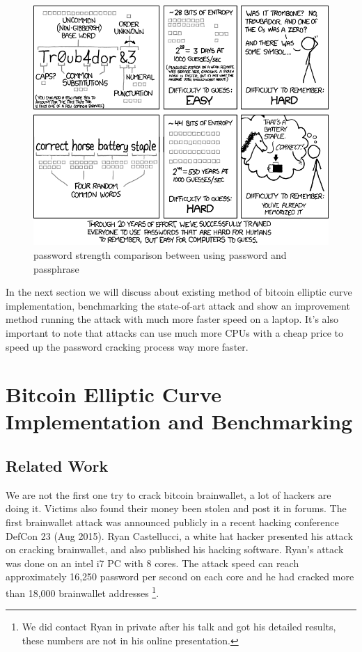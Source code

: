  \begin{figure}[h!]
 	\centering
 	\includegraphics[width=140mm]{./pics/password_strength.png}
 	\caption{password strength comparison between using password and passphrase}
 	\label{fig:password_strength}
 \end{figure}
 
In the next section we will discuss about existing method of bitcoin elliptic curve implementation, benchmarking the state-of-art attack and show an improvement method running the attack with much more faster speed on a laptop. It's also important to note that attacks can use much more CPUs with a cheap price to speed up the password cracking process way more faster.

\section{Bitcoin Elliptic Curve Implementation and Benchmarking}
\subsection{Related Work}
We are not the first one try to crack bitcoin brainwallet, a lot of hackers are doing it. Victims also found their money been stolen and post it in forums. The first brainwallet attack was announced publicly in a recent hacking conference DefCon 23 (Aug 2015). Ryan Castellucci, a white hat hacker presented his attack on cracking brainwallet, and also published his hacking software\cite{RyanDefcon}. Ryan's attack was done on an intel i7 PC with 8 cores. The attack speed can reach approximately 16,250 password per second on each core and he had cracked more than 18,000 brainwallet addresses \footnote{We did contact Ryan in private after his talk and got his detailed results, these numbers are not in his online presentation.}.

